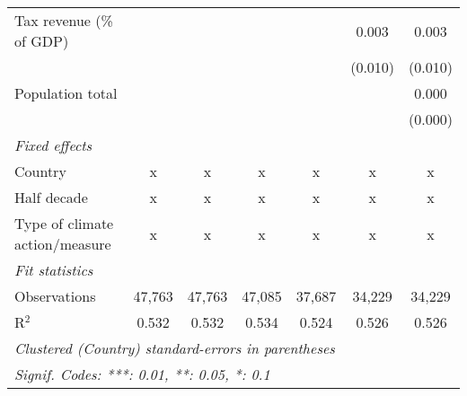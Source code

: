 \begin{tabular}{lcccccc}
   Tax revenue (\% of GDP)              &         &              &               &                & 0.003          & 0.003\\   
                                        &         &              &               &                & (0.010)        & (0.010)\\   
   Population total                     &         &              &               &                &                & 0.000\\   
                                        &         &              &               &                &                & (0.000)\\   
   \emph{Fixed effects}\\
   Country                              & x       & x            & x             & x              & x              & x\\  
   Half decade                          & x       & x            & x             & x              & x              & x\\  
   Type of climate action/measure       & x       & x            & x             & x              & x              & x\\  
   \midrule \emph{Fit statistics}\\
   Observations                         & 47,763  & 47,763       & 47,085        & 37,687         & 34,229         & 34,229\\  
   R$^2$                                & 0.532   & 0.532        & 0.534         & 0.524          & 0.526          & 0.526\\  
   \midrule
   \multicolumn{7}{l}{\emph{Clustered (Country) standard-errors in parentheses}}\\
   \multicolumn{7}{l}{\emph{Signif. Codes: ***: 0.01, **: 0.05, *: 0.1}}\\
\end{tabular}
\par\endgroup


